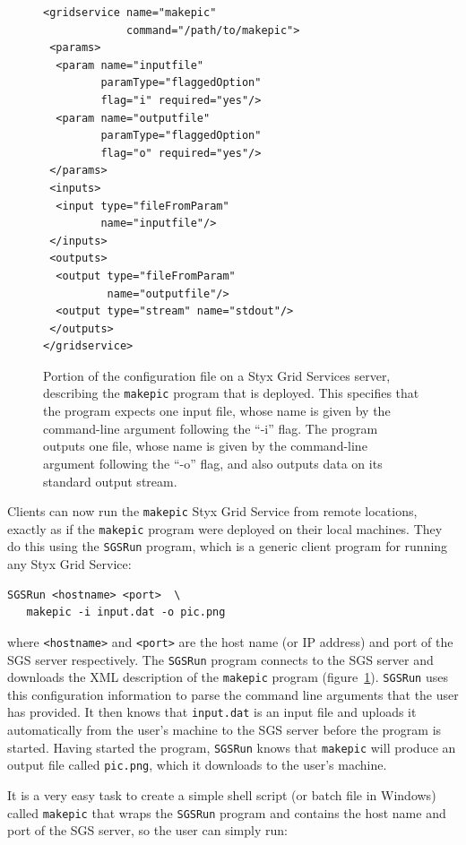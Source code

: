 \documentclass[times,10pt,twocolumn,8.5x11]{article}
\begin{document}
\begin{figure}
\centering
\small{
\begin{verbatim}
<gridservice name="makepic"
             command="/path/to/makepic">
 <params>
  <param name="inputfile"
         paramType="flaggedOption"
         flag="i" required="yes"/>
  <param name="outputfile"
         paramType="flaggedOption"
         flag="o" required="yes"/>
 </params>
 <inputs>
  <input type="fileFromParam"
         name="inputfile"/>
 </inputs>
 <outputs>
  <output type="fileFromParam"
          name="outputfile"/>
  <output type="stream" name="stdout"/>
 </outputs>
</gridservice>
\end{verbatim}
}
\caption{Portion of the configuration file on a Styx Grid Services server, describing the {\tt makepic} program that is deployed.  This specifies that the program expects one input file, whose name is given by the command-line argument following the ``-i'' flag.  The program outputs one file, whose name is given by the command-line argument following the ``-o'' flag, and also outputs data on its standard output stream.}
\label{fig:makepicconfig}
\end{figure}

Clients can now run the {\tt makepic} Styx Grid Service from remote locations, exactly as if the {\tt makepic} program were deployed on their local machines.  They do this using the {\tt SGSRun} program, which is a generic client program for running any Styx Grid Service:

\begin{verbatim}
SGSRun <hostname> <port>  \
   makepic -i input.dat -o pic.png
\end{verbatim}
where {\tt <hostname>} and {\tt <port>} are the host name (or IP address) and port of the SGS server respectively.  The {\tt SGSRun} program connects to the SGS server and downloads the XML description of the {\tt makepic} program  (figure~\ref{fig:makepicconfig}).  {\tt SGSRun} uses this configuration information to parse the command line arguments that the user has provided.  It then knows that {\tt input.dat} is an input file and uploads it automatically from the user's machine to the SGS server before the program is started.  Having started the program, {\tt SGSRun} knows that {\tt makepic} will produce an output file called {\tt pic.png}, which it downloads to the user's machine.

It is a very easy task to create a simple shell script (or batch file in Windows) called {\tt makepic} that wraps the {\tt SGSRun} program and contains the host name and port of the SGS server, so the user can simply run:
\end{document}
